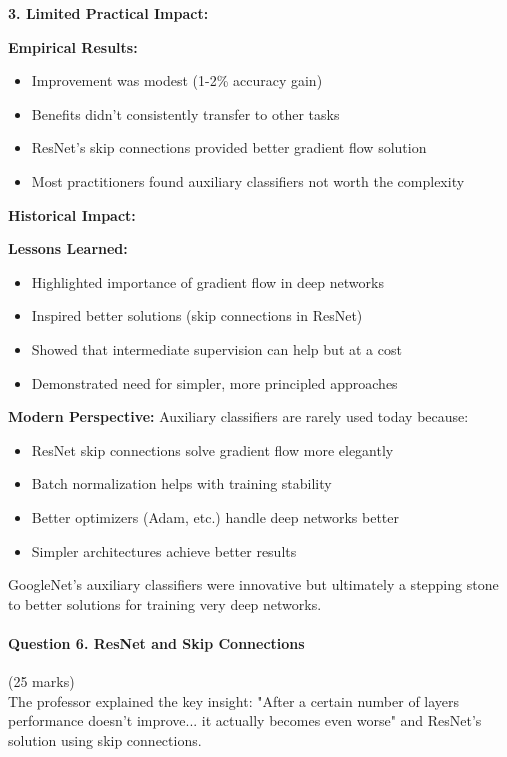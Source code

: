 \documentclass[12pt]{article}
\begin{document}
\begin{enumerate}[(a)]
{    \textbf{3. Limited Practical Impact:}
    
    \textbf{Empirical Results:}
    \begin{itemize}
        \item Improvement was modest (1-2\% accuracy gain)
        \item Benefits didn't consistently transfer to other tasks
        \item ResNet's skip connections provided better gradient flow solution
        \item Most practitioners found auxiliary classifiers not worth the complexity
    \end{itemize}
    
    \textbf{Historical Impact:}
    
    \textbf{Lessons Learned:}
    \begin{itemize}
        \item Highlighted importance of gradient flow in deep networks
        \item Inspired better solutions (skip connections in ResNet)
        \item Showed that intermediate supervision can help but at a cost
        \item Demonstrated need for simpler, more principled approaches
    \end{itemize}
    
    \textbf{Modern Perspective:}
    Auxiliary classifiers are rarely used today because:
    \begin{itemize}
        \item ResNet skip connections solve gradient flow more elegantly
        \item Batch normalization helps with training stability
        \item Better optimizers (Adam, etc.) handle deep networks better
        \item Simpler architectures achieve better results
    \end{itemize}
    
    GoogleNet's auxiliary classifiers were innovative but ultimately a stepping stone to better solutions for training very deep networks.
    }
\end{enumerate}

\newpage
\paragraph{Question 6. ResNet and Skip Connections}{\hfill (25 marks)}\\
The professor explained the key insight: "After a certain number of layers performance doesn't improve... it actually becomes even worse" and ResNet's solution using skip connections.
\end{document}

